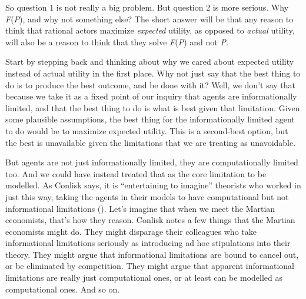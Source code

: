 \documentclass[
  11pt,
  letterpaper,
  DIV=11,
  numbers=noendperiod,
  twoside]{scrartcl}
\begin{document}
So question 1 is not really a big problem. But question 2 is more
serious. Why \emph{F}(\emph{P}), and why not something else? The short
answer will be that any reason to think that rational actors maximize
\emph{expected} utility, as opposed to \emph{actual} utility, will also
be a reason to think that they solve \emph{F}(\emph{P}) and not
\emph{P}.

Start by stepping back and thinking about why we cared about expected
utility instead of actual utility in the first place. Why not just say
that the best thing to do is to produce the best outcome, and be done
with it? Well, we don't say that because we take it as a fixed point of
our inquiry that agents are informationally limited, and that the best
thing to do is what is best given that limitation. Given some plausible
assumptions, the best thing for the informationally limited agent to do
would be to maximize expected utility. This is a second-best option, but
the best is unavailable given the limitations that we are treating as
unavoidable.

But agents are not just informationally limited, they are
computationally limited too. And we could have instead treated that as
the core limitation to be modelled. As Conlisk says, it is
``entertaining to imagine'' theorists who worked in just this way,
taking the agents in their models to have computational but not
informational limitations (). Let's imagine that when we meet the Martian economists, that's
how they reason. Conlisk notes a few things that the Martian economists
might do. They might disparage their colleagues who take informational
limitations seriously as introducing ad hoc stipulations into their
theory. They might argue that informational limitations are bound to
cancel out, or be eliminated by competition. They might argue that
apparent informational limitations are really just computational ones,
or at least can be modelled as computational ones. And so on.
\end{document}
